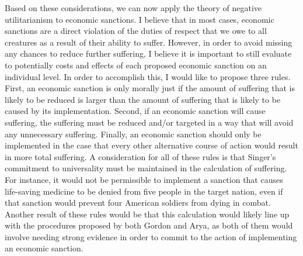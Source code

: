 \documentclass[12pt]{article}
\begin{document}
Based on these considerations, we can now apply the theory of negative utilitarianism to economic sanctions.
I believe that in most cases, economic sanctions are a direct violation of the duties of respect that we owe to all creatures as a result of their ability to suffer.
However, in order to avoid missing any chances to reduce further suffering, I believe it is important to still evaluate to potentially costs and effects of each proposed economic sanction on an individual level.
In order to accomplish this, I would like to propose three rules.
First, an economic sanction is only morally just if the amount of suffering that is likely to be reduced is larger than the amount of suffering that is likely to be caused by its implementation.
Second, if an economic sanction will cause suffering, the suffering must be reduced and/or targeted in a way that will avoid any unnecessary suffering.
Finally, an economic sanction should only be implemented in the case that every other alternative course of action would result in more total suffering.
A consideration for all of these rules is that Singer's commitment to universality must be maintained in the calculation of suffering.
For instance, it would not be permissible to implement a sanction that causes life-saving medicine to be denied from five people in the target nation, even if that sanction would prevent four American soldiers from dying in combat.
Another result of these rules would be that this calculation would likely line up with the procedures proposed by both Gordon and Arya, as both of them would involve needing strong evidence in order to commit to the action of implementing an economic sanction.
\end{document}
